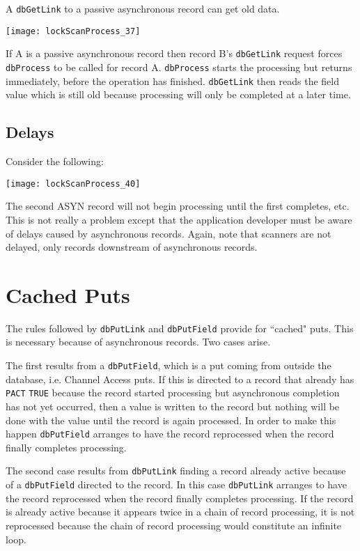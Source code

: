 A \verb|dbGetLink| to a passive asynchronous record can get old data.

\begin{center}
\texttt{[image: lockScanProcess\_37]}
\end{center}

If A is a passive asynchronous record then record B's \verb|dbGetLink| request forces \verb|dbProcess| to be called for record A.
\verb|dbProcess| starts the processing but returns immediately, before the operation has finished.
\verb|dbGetLink| then reads the field value which is still old because processing will only be completed at a later time.

\subsection{Delays}

Consider the following:

\begin{center}
\texttt{[image: lockScanProcess\_40]}
\end{center}

The second ASYN record will not begin processing until the first completes, etc.
This is not really a problem except that the application developer must be aware of delays caused by asynchronous records.
Again, note that scanners are not delayed, only records downstream of asynchronous records.

\section{Cached Puts}

The rules followed by \verb|dbPutLink| and \verb|dbPutField| provide for ``cached" puts.
This is necessary because of asynchronous records.
Two cases arise.

The first results from a \verb|dbPutField|, which is a put coming from outside the database, i.e. Channel Access puts.
If this is directed to a record that already has \verb|PACT| \verb|TRUE| because the record started processing but asynchronous completion has not yet occurred, then a value is written to the record but nothing will be done with the value until the record is again 
processed.
In order to make this happen \verb|dbPutField| arranges to have the record reprocessed when the record finally completes processing.

The second case results from \verb|dbPutLink| finding a record already active because of a \verb|dbPutField| directed to the record.
In this case \verb|dbPutLink| arranges to have the record reprocessed when the record finally completes processing.
If the record is already active because it appears twice in a chain of record processing, it is not reprocessed because the chain of record processing would constitute an infinite loop.

